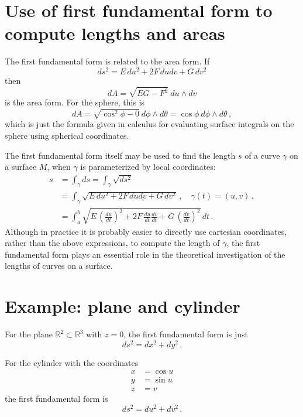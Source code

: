 \documentclass[12pt]{article}
\newcommand{\real}{\mathbb{R}}
\begin{document}
\section*{Use of first fundamental form to compute lengths and areas}

The first fundamental form is related to the area form.
If
\[
ds^2 = E \, du^2 + 2F \, du dv + G \, dv^2
\]
then
\[
dA = \sqrt{EG-F^2} \: du \wedge dv
\]
is the area form.
For the sphere, this
is \[
dA = \sqrt{\cos^2 \phi - 0} \: d\phi \wedge d\theta = \cos \phi \: d\phi \wedge d\theta\,,
\]
which is just the formula given in calculus for evaluating
surface integrals on the sphere using spherical coordinates.

The first fundamental form itself may be used to find the 
length $s$ of a curve $\gamma$ on a surface $M$,
when $\gamma$ is parameterized by local coordinates:
\begin{align*}
s &= \int_\gamma ds = \int_\gamma \sqrt{ds^2} \\
&= \int_\gamma \sqrt{E \, du^2 + 2F \, du dv + G \, dv^2} \,,
\quad 
\gamma(t) = (u,v)\,, \\
&= \int_a^b \sqrt{E \, \left(\frac{du}{dt}\right)^2 + 2F \, \frac{du}{dt} \frac{dv}{dt} + 
G \, \left(\frac{dv}{dt} \right)^2} \, dt\,.
\end{align*}
Although in practice it is probably easier to directly use 
cartesian coordinates, rather
than the above expressions, to compute the length of $\gamma$,
the first fundamental form plays an essential role in the 
theoretical investigation of the lengths
of curves on a surface.

\section*{Example: plane and cylinder}
For the plane $\real^2 \subset \real^3$ with $z = 0$,
the first fundamental form is just
\begin{equation}\label{plane}
ds^2 = dx^2 + dy^2\,.
\end{equation}

For the cylinder with the coordinates
\begin{align*}
x &= \cos u \\
y &= \sin u \\
z &= v
\end{align*}
the first fundamental form is
\begin{equation}\label{cylinder}
ds^2 = du^2 + dv^2\,.
\end{equation}
\end{document}
